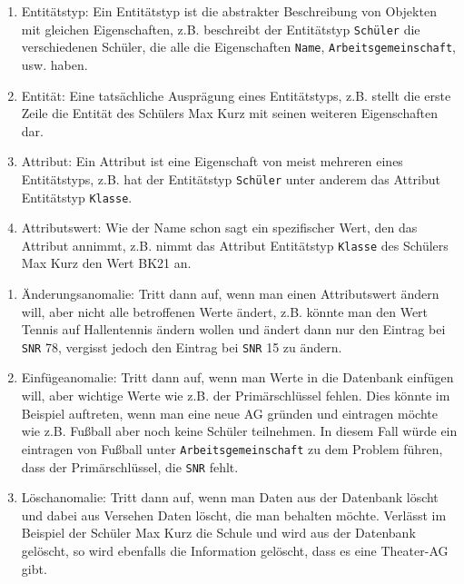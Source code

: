 \documentclass[a4paper,12pt, headsepline, ngerman]{scrartcl}
\begin{document}
	\begin{Answer}[ref=KABegriffeDefinieren]
		\begin{enumerate}
			\item Entitätstyp: Ein Entitätstyp ist die abstrakter Beschreibung von Objekten mit gleichen Eigenschaften, z.B. beschreibt der Entitätstyp \lstinline!Schüler! die verschiedenen Schüler, die alle die Eigenschaften \lstinline!Name!, \lstinline!Arbeitsgemeinschaft!, usw. haben.
			\item Entität: Eine tatsächliche Ausprägung eines Entitätstyps, z.B. stellt die erste Zeile die Entität des Schülers Max Kurz mit seinen weiteren Eigenschaften dar.
			\item Attribut: Ein Attribut ist eine Eigenschaft von meist mehreren eines Entitätstyps, z.B. hat der Entitätstyp \lstinline!Schüler! unter anderem  das Attribut Entitätstyp \lstinline!Klasse!.
			\item Attributswert: Wie der Name schon sagt ein spezifischer Wert, den das Attribut annimmt, z.B. nimmt das Attribut Entitätstyp \lstinline!Klasse! des Schülers Max Kurz den Wert BK21 an.
		\end{enumerate}
	\end{Answer}%
	\begin{Answer}[ref=KAAnomalien]
		\begin{enumerate}
			\item Änderungsanomalie: Tritt dann auf, wenn man einen Attributswert ändern will, aber nicht alle betroffenen Werte ändert, z.B. könnte man den Wert Tennis auf Hallentennis ändern wollen und ändert dann nur den Eintrag bei \lstinline!SNR! 78, vergisst jedoch den Eintrag bei \lstinline!SNR! 15 zu ändern.
			\item Einfügeanomalie: Tritt dann auf, wenn man Werte in die Datenbank einfügen will, aber wichtige Werte wie z.B. der Primärschlüssel fehlen. Dies könnte im Beispiel auftreten, wenn man eine neue AG gründen und eintragen möchte wie z.B. Fußball aber noch keine Schüler teilnehmen. In diesem Fall würde ein eintragen von Fußball unter \lstinline!Arbeitsgemeinschaft! zu dem Problem führen, dass der Primärschlüssel, die \lstinline!SNR! fehlt.
			\item Löschanomalie: Tritt dann auf, wenn man Daten aus der Datenbank löscht und dabei aus Versehen Daten löscht, die man behalten möchte. Verlässt im Beispiel der Schüler Max Kurz die Schule und wird aus der Datenbank gelöscht, so wird ebenfalls die Information gelöscht, dass es eine Theater-AG gibt.
		\end{enumerate}
	\end{Answer}%
\end{document}

